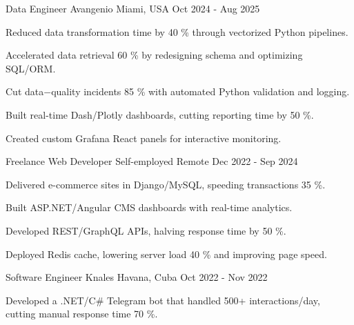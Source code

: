 \documentclass[]{awesome-cv}
\begin{document}
\begin{cventries}
  \cventry
    {Data Engineer}
    {Avangenio}
    {Miami, USA}
    {Oct 2024 - Aug 2025}
    {\begin{cvitems}
        \item Reduced data transformation time by 40 \% through vectorized Python pipelines.
        \item Accelerated data retrieval 60 \% by redesigning schema and optimizing SQL/ORM.
        \item Cut data$-$quality incidents 85 \% with automated Python validation and logging.
        \item Built real-time Dash/Plotly dashboards, cutting reporting time by 50 \%.
        \item Created custom Grafana React panels for interactive monitoring.
      \end{cvitems}}

  \cventry
    {Freelance Web Developer}
    {Self-employed}
    {Remote}
    {Dec 2022 - Sep 2024}
    {\begin{cvitems}
        \item Delivered e-commerce sites in Django/MySQL, speeding transactions 35 \%.
        \item Built ASP.NET/Angular CMS dashboards with real-time analytics.
        \item Developed REST/GraphQL APIs, halving response time by 50 \%.
        \item Deployed Redis cache, lowering server load 40 \% and improving page speed.
      \end{cvitems}}

  \cventry
    {Software Engineer}
    {Knales}
    {Havana, Cuba}
    {Oct 2022 - Nov 2022}
    {\begin{cvitems}
        \item Developed a .NET/C\# Telegram bot that handled 500+ interactions/day, cutting manual response time 70 \%.
      \end{cvitems}}
\end{cventries}
\end{document}
